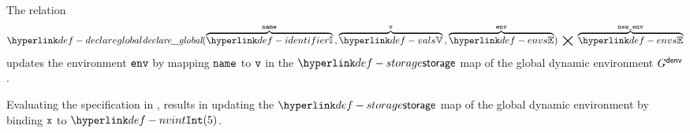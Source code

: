\begin{mathpar}
\end{mathpar}

\ProseParagraph
The relation
\hypertarget{def-declareglobal}{}
\[
  \declareglobal(\overname{\Identifiers}{\name} \aslsep \overname{\vals}{\vv} \aslsep \overname{\envs}{\env}) \;\aslrel\; \overname{\envs}{\newenv}
\]
updates the environment $\env$ by mapping $\name$ to $\vv$ in the $\storage$ map of the global dynamic environment $G^\denv$.

Evaluating the specification in , results in updating the $\storage$ map
of the global dynamic environment by binding $\vx$ to $\nvint(5)$.

\FormallyParagraph
\begin{mathpar}
\end{mathpar}

